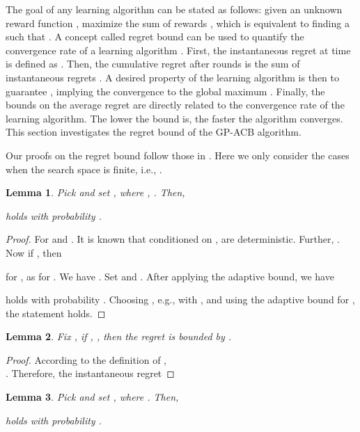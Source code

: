 \documentclass[10pt]{article}
\theoremstyle{plain}
\newtheorem{lemma}{Lemma}
\begin{document}
The goal of any learning algorithm can be stated as follows: given an unknown reward function , maximize the sum of rewards , which is equivalent to finding a  such that . A concept called regret bound can be used to quantify the convergence rate of a learning algorithm \cite{Niranjan2009,Settles2010,auer2009near}. First, the instantaneous regret at time  is defined as . Then, the cumulative regret  after  rounds is the sum of instantaneous regrets . A desired property of the learning algorithm is then to guarantee , implying the convergence to the global maximum . Finally, the bounds on the average regret  are directly related to the convergence rate of the learning algorithm. The lower the bound is, the faster the algorithm converges. This section investigates the regret bound of the GP-ACB algorithm.

Our proofs on the regret bound follow those in \cite{Niranjan2009}. Here we only consider the cases when the search space is finite, i.e., .

\begin{lemma}
\label{Lemma 1}
Pick  and set , where , . Then,

holds with probability .
\end{lemma}

\begin{proof} \renewcommand{\qedsymbol}{}
For  and . It is known that conditioned on ,  are deterministic. Further, . Now if , then

for , as  for . We have . Set  and . After applying the adaptive bound, we have

holds with probability . Choosing , e.g., with , and using the adaptive bound for , the statement holds.
\end{proof}

\begin{lemma}
\label{Lemma 2}
Fix , if , , then the regret  is bounded by .
\end{lemma}

\begin{proof} \renewcommand{\qedsymbol}{}
According to the definition of ,  \\ . Therefore, the instantaneous regret 

\end{proof}

\begin{lemma}
\label{Lemma 3}
Pick  and set , where . Then,

holds with probability .
\end{lemma}
\end{document}
